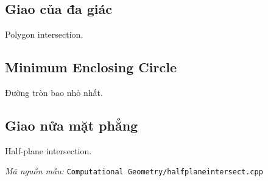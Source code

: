 \documentclass[11pt]{article}
\newcommand{\codepath}[1]{\par\noindent\textit{Mã nguồn mẫu:} \texttt{#1}\par}
\begin{document}
\subsection{Giao của đa giác}

Polygon intersection.

\subsection{Minimum Enclosing Circle}

Đường tròn bao nhỏ nhất.

\subsection{Giao nửa mặt phẳng}

Half-plane intersection.

\codepath{Computational Geometry/halfplaneintersect.cpp}
\end{document}

